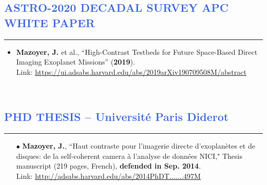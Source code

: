 \documentclass[12pt]{article}
\begin{document}

\vspace{-1cm}
\textcolor{RoyalBlue}{\section{\large ASTRO-2020 DECADAL SURVEY APC WHITE PAPER}
\vspace{-0.35cm}\hrule}
\vspace{0.5cm}
\begin{itemize}
\item \textbf{Mazoyer, J.} et al., “High-Contrast Testbeds for Future Space-Based Direct Imaging Exoplanet Missions” (\textbf{2019}).\\
Link: \textcolor{BrickRed}{\underline{\url{https://ui.adsabs.harvard.edu/abs/2019arXiv190709508M/abstract}}}
\end{itemize}

\newpage
\textcolor{White}{.}
\vspace{-1.8cm}
\textcolor{RoyalBlue}{\section{\large PHD THESIS -- Universit\'e Paris Diderot}
\vspace{-0.35cm}\hrule}
\vspace{0.5cm}

\begin{itemize}
\item[$\bullet$] \textbf{Mazoyer, J.}, “Haut contraste pour l'imagerie directe d'exoplanètes et de disques: de la self-coherent camera à l'analyse de données NICI," Thesis manuscript (219 pages, French), \textbf{defended in Sep. 2014}. \\
Link: \textcolor{BrickRed}{\underline{\url{http://adsabs.harvard.edu/abs/2014PhDT.......497M}}}
\end{itemize}
\end{document}
